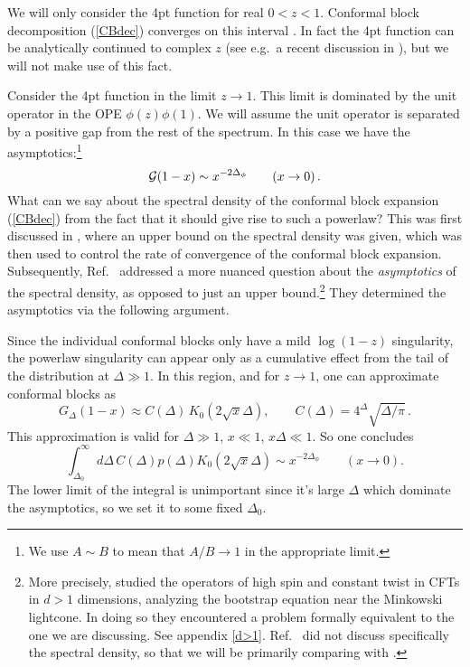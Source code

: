 \documentclass[12pt]{article}
\newcommand{\reef}[1]{(\ref{#1})}
\newcommand{\beq}{\begin{equation}}
\newcommand{\eeq}{\end{equation}}
\def\calG {{\cal G}}
\newcommand{\be}{\begin{equation}}
\newcommand{\ee}{\end{equation}}
\newcommand{\D}{\Delta}
\numberwithin{equation}{section}
\begin{document}
We will only consider the 4pt function for real $0<z<1$. Conformal block decomposition \reef{CBdec} converges on this interval \cite{Pappadopulo:2012jk}. In fact the 4pt function can be analytically continued to complex $z$ (see e.g.~a recent discussion in \cite{Rychkov:2017tpc}), but we will not make use of this fact.

Consider the 4pt function in the limit $z\to 1$. This limit is dominated by the unit operator in the OPE $\phi(z)\phi(1)$. We will assume the unit operator is separated by a positive gap from the rest of the spectrum. In this case we have the asymptotics:\footnote{We use $A\sim B$ to mean that $A/B\to 1$ in the appropriate limit.}
\beq
\calG(1-x)\sim x^{-2\Delta_\phi} \qquad (x\to 0)\,.
\label{zto1}
\eeq
What can we say about the spectral density of the conformal block expansion \reef{CBdec} from the fact that it should give rise to such a powerlaw? This was first discussed in \cite{Pappadopulo:2012jk}, where an upper bound on the spectral density was given, which was then used to control the rate of convergence of the conformal block expansion. Subsequently, Ref.~\cite{Fitzpatrick:2012yx} addressed a more nuanced question about the \emph{asymptotics} of the spectral density, as opposed to just an upper bound.\footnote{More precisely, \cite{Fitzpatrick:2012yx,Komargodski:2012ek} studied the operators of high spin and constant twist in CFTs in $d>1$ dimensions, analyzing the bootstrap equation near the Minkowski lightcone. In doing so they encountered a problem formally equivalent to the one we are discussing. See appendix \ref{d>1}. Ref.~\cite{Komargodski:2012ek} did not discuss specifically the spectral density, so that we will be primarily comparing with \cite{Fitzpatrick:2012yx}.} They determined the asymptotics via the following argument.

Since the individual conformal blocks only have a mild $\log(1-z)$ singularity, the powerlaw singularity can appear only as a cumulative effect from the tail of the distribution at $\Delta \gg 1$. In this region, and for $z\to 1$, one can approximate conformal blocks as
\beq
\label{CBappr}
G_\Delta(1-x)\approx C(\D)\,K_0(2\sqrt{x}\D),\qquad C(\D)={4^\D \sqrt{\D/\pi}} \,.
\eeq
This approximation is valid for $\D\gg1$, $x\ll 1$, $x\D\ll 1$. So one concludes
\be
\label{Gappr}
\int_{\Delta_0}^\infty\, d\Delta\, C(\Delta) p(\Delta)  K_0(2\sqrt{x}\D) \sim x^{-2\Delta_\phi}\qquad (x\to 0).
\ee
The lower limit of the integral is unimportant since it's large $\D$ which dominate the asymptotics, so we set it to some fixed $\Delta_0$.
\end{document}
